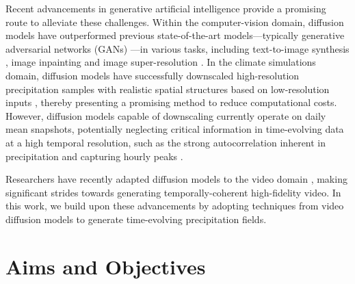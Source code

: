 \documentclass[ oneside,%
                    author={George Herbert},
                    degree={MSci},
                     title={Diffusion Models for Time-Evolving Precipitation Fields},
                  subtitle={}]{dissertation}
\begin{document}
Recent advancements in generative artificial intelligence provide a promising route to alleviate these challenges. Within the computer-vision domain, diffusion models \cite{Deep_Unsupervised_Learning_Sohl-Dickstein, DDPM_Ho, Score_Based_Song} have outperformed previous state-of-the-art models---typically generative adversarial networks (GANs) \cite{Goodfellow_Generative_Adversarial_Networks}---in various tasks, including text-to-image synthesis \cite{Ramesh_Zero-Shot_Text-to-Image_Generation,Rombach_High-Resolution_Image_Synthesis_with_Latent_Diffusion_Models,Imagen_Saharia}, image inpainting \cite{Score_Based_Song,Lugamyr_RePaint} and image super-resolution \cite{Saharia_Image_Super-Resolution_via_Iterative_Refinement,Cascaded_Ho}. In the climate simulations domain, diffusion models have successfully downscaled high-resolution precipitation samples with realistic spatial structures based on low-resolution inputs \cite{Addison_Machine_Learning_Emulation}, thereby presenting a promising method to reduce computational costs. However, diffusion models capable of downscaling currently operate on daily mean snapshots, potentially neglecting critical information in time-evolving data at a high temporal resolution, such as the strong autocorrelation inherent in precipitation and capturing hourly peaks \cite{MO_RCP_Guidance}.

Researchers have recently adapted diffusion models to the video domain \cite{VDM_Ho, Imagen_Video_Ho}, making significant strides towards generating temporally-coherent high-fidelity video. In this work, we build upon these advancements by adopting techniques from video diffusion models to generate time-evolving precipitation fields.

\section{Aims and Objectives}
\end{document}
